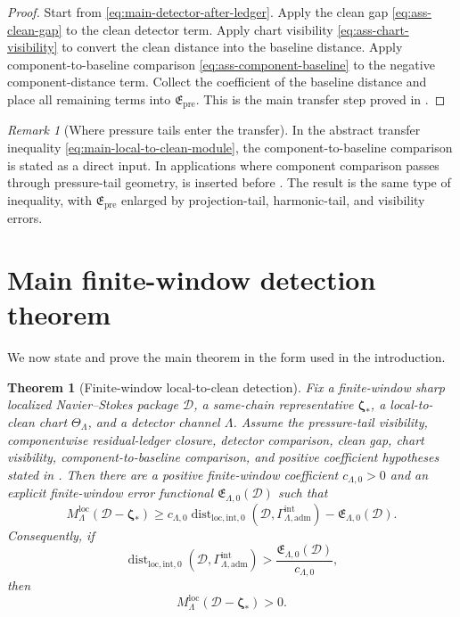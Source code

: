 \documentclass[11pt]{article}
\numberwithin{equation}{section}
\newtheorem{theorem}{Theorem}[section]
\theoremstyle{definition}
\theoremstyle{remark}
\newtheorem{remark}[remark]{Remark}
\newcommand{\loc}{\mathrm{loc}}
\newcommand{\intg}{\mathrm{int}}
\newcommand{\adm}{\mathrm{adm}}
\newcommand{\Dist}{\operatorname{dist}}
\newcommand{\calD}{\mathcal D}
\newcommand{\bzeta}{\boldsymbol\zeta}
\begin{document}
\begin{proof}
Start from \eqref{eq:main-detector-after-ledger}.  Apply the clean gap \eqref{eq:ass-clean-gap} to the clean detector term.  Apply chart visibility \eqref{eq:ass-chart-visibility} to convert the clean distance into the baseline distance.  Apply component-to-baseline comparison \eqref{eq:ass-component-baseline} to the negative component-distance term.  Collect the coefficient of the baseline distance and place all remaining terms into \(\mathfrak E_{\mathrm{pre}}\).  This is the main transfer step proved in .
\end{proof}

\begin{remark}[Where pressure tails enter the transfer]
In the abstract transfer inequality \eqref{eq:main-local-to-clean-module}, the component-to-baseline comparison is stated as a direct input.  In applications where component comparison passes through pressure-tail geometry,  is inserted before .  The result is the same type of inequality, with \(\mathfrak E_{\mathrm{pre}}\) enlarged by projection-tail, harmonic-tail, and visibility errors.
\end{remark}

\section{Main finite-window detection theorem}\label{sec:main-proof}

We now state and prove the main theorem in the form used in the introduction.

\begin{theorem}[Finite-window local-to-clean detection]\label{thm:journal-main}
Fix a finite-window sharp localized Navier--Stokes package \(\calD\), a same-chain representative \(\bzeta_*\), a local-to-clean chart \(\Theta_\Lambda\), and a detector channel \(\Lambda\).  Assume the pressure-tail visibility, componentwise residual-ledger closure, detector comparison, clean gap, chart visibility, component-to-baseline comparison, and positive coefficient hypotheses stated in .  Then there are a positive finite-window coefficient \(c_{\Lambda,0}>0\) and an explicit finite-window error functional \(\mathfrak E_{\Lambda,0}(\calD)\) such that
\begin{equation}\label{eq:journal-main}
        M_{\Lambda}^{\loc}(\calD-\bzeta_*)
        \ge
        c_{\Lambda,0}
        \Dist_{\loc,\intg,0}(\calD,\Gamma^{\intg}_{\Lambda,\adm})
        -
        \mathfrak E_{\Lambda,0}(\calD).
\end{equation}
Consequently, if
\begin{equation}\label{eq:positive-detection-threshold}
        \Dist_{\loc,\intg,0}(\calD,\Gamma^{\intg}_{\Lambda,\adm})
        >
        \frac{\mathfrak E_{\Lambda,0}(\calD)}{c_{\Lambda,0}},
\end{equation}
then
\[
        M_{\Lambda}^{\loc}(\calD-\bzeta_*)>0.
\]
\end{theorem}
\end{document}
